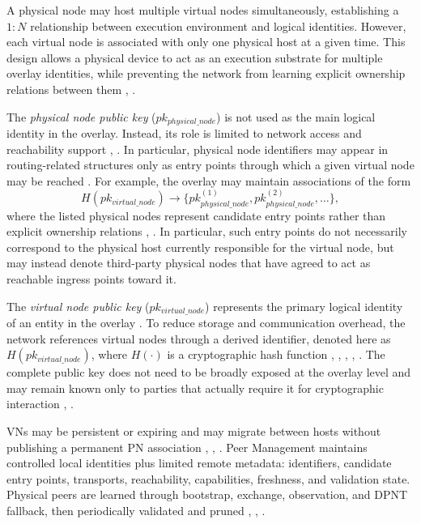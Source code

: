 \documentclass[
  12pt,
  oneside,
  a4paper,
  chapter=TITLE,
  section=TITLE,
  english,
  brazil
]{abntex2}
\begin{document}
A physical node may host multiple virtual nodes simultaneously, establishing a $1:N$ relationship between execution environment and logical identities. However, each virtual node is associated with only one physical host at a given time. This design allows a physical device to act as an execution substrate for multiple overlay identities, while preventing the network from learning explicit ownership relations between them \cite{mirzaei2018pk}, \cite{qian2016garlic}.

The \textit{physical node public key} ($pk_{physical\_node}$) is not used as the main logical identity in the overlay. Instead, its role is limited to network access and reachability support \cite{li2022unreachable}, \cite{mirzaei2018pk}. In particular, physical node identifiers may appear in routing-related structures only as entry points through which a given virtual node may be reached \cite{li2022unreachable}. For example, the overlay may maintain associations of the form
\[
H(pk_{virtual\_node}) \rightarrow \{pk_{physical\_node}^{(1)}, pk_{physical\_node}^{(2)}, \dots\},
\]
where the listed physical nodes represent candidate entry points rather than explicit
ownership relations \cite{li2022unreachable}, \cite{mirzaei2018pk}. In particular, such entry points do not necessarily correspond
to the physical host currently responsible for the virtual node, but may instead denote
third-party physical nodes that have agreed to act as reachable ingress points toward it.

The \textit{virtual node public key} ($pk_{virtual\_node}$) represents the primary logical identity of an entity in the overlay \cite{mirzaei2018pk}. To reduce storage and communication overhead, the network references virtual nodes through a derived identifier, denoted here as $H(pk_{virtual\_node})$, where $H(\cdot)$ is a cryptographic hash function \cite{stoica2001chord}, \cite{maymounkov2002kademlia}, \cite{rowstron2001pastry}, \cite{augustine2022byzantine}, \cite{mirzaei2018pk}. The complete public key does not need to be broadly exposed at the overlay level and may remain known only to parties that actually require it for cryptographic interaction \cite{mirzaei2018pk}, \cite{qian2016garlic}.

VNs may be persistent or expiring and may migrate between hosts without publishing a permanent PN association \cite{li2022unreachable}, \cite{mirzaei2018pk}, \cite{qian2016garlic}. Peer Management maintains controlled local identities plus limited remote metadata: identifiers, candidate entry points, transports, reachability, capabilities, freshness, and validation state. Physical peers are learned through bootstrap, exchange, observation, and DPNT fallback, then periodically validated and pruned \cite{li2022unreachable}, \cite{augustine2022byzantine}, \cite{qian2016garlic}.
\end{document}
